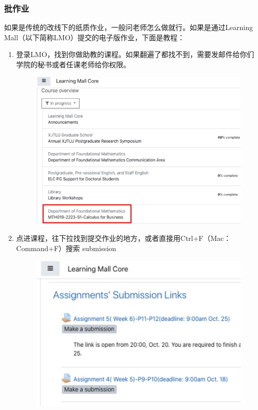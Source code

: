 \subsubsection{批作业}
如果是传统的改线下的纸质作业，一般问老师怎么做就行。如果是通过Learning Mall（以下简称LMO）提交的电子版作业，下面是教程：
\begin{enumerate}
    \item 登录LMO，找到你做助教的课程。如果翻遍了都找不到，需要发邮件给你们学院的秘书或者任课老师给你权限。
    \begin{figure}[H]
        \centering
        \includegraphics[width=0.4\columnwidth]{author-folder/Kai.Wu/LMO_course.jpg}
    \end{figure}

    \item 
    \begin{minipage}{0.3\textwidth}
        点进课程，往下拉找到提交作业的地方，或者直接用Ctrl+F（Mac：Command+F）搜索 submission
    \end{minipage}
    \begin{minipage}{0.63\textwidth}
        \begin{figure}[H]
            \includegraphics[width=0.95\columnwidth, right]{author-folder/Kai.Wu/LMO_submission_links.jpg}
        \end{figure}
    \end{minipage}


\end{enumerate}
